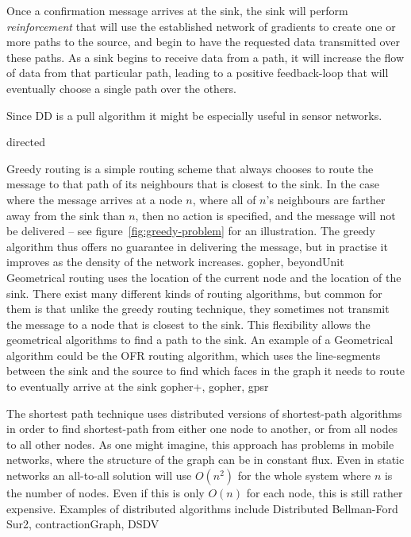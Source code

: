 \begin{description}
{Once a confirmation message arrives at the sink, the sink will perform \emph{reinforcement} that will use the established network of gradients to create one or more paths to the source, and begin to have the requested data transmitted over these paths. As a sink begins to receive data from a path, it will increase the flow of data from that particular path, leading to a positive feedback-loop that will eventually choose a single path over the others.

Since DD is a pull algorithm it might be especially useful in sensor networks.}
{directed}

{\label{greedy}Greedy routing is a simple routing scheme that always chooses to route the message to that path of its neighbours that is closest to the sink. In the case where the message arrives at a node $n$, where all of $n$'s neighbours are farther away from the sink than $n$, then no action is specified, and the message will not be delivered -- see figure~\ref{fig:greedy-problem} for an illustration. The greedy algorithm thus offers no guarantee in delivering the message, but in practise it improves as the density of the network increases.}
{gopher, beyondUnit}
{Geometrical routing uses the location of the current node and the location of the sink. There exist many different kinds of routing algorithms, but common for them is that unlike the greedy routing technique, they sometimes not transmit the message to a node that is closest to the sink. This flexibility allows the geometrical algorithms to find a path to the sink. An example of a Geometrical algorithm could be the OFR \cite{gopher} routing algorithm, which uses the line-segments between the sink and the source to find which faces in the graph it needs to route to eventually arrive at the sink}
{gopher+, gopher, gpsr}

      {The shortest path technique uses distributed versions of shortest-path algorithms in order to find shortest-path from either one node to another, or from all nodes to all other nodes. As one might imagine, this approach has problems in mobile networks, where the structure of the graph can be in constant flux. Even in static networks an all-to-all solution will use $O(n^2)$ for the whole system where $n$ is the number of nodes. Even if this is only $O(n)$ for each node, this is still rather expensive. Examples of distributed algorithms include Distributed Bellman-Ford}
{Sur2, contractionGraph, DSDV}

\end{description}

